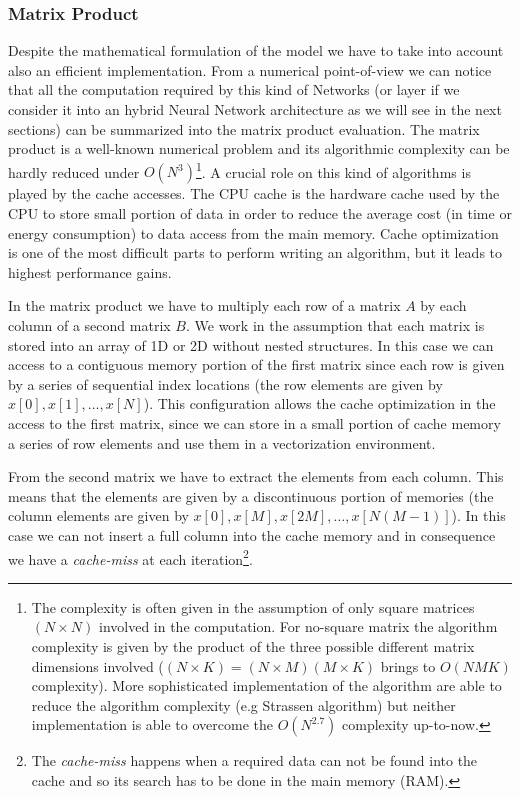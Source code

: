\documentclass{standalone}
\begin{document}
\subsubsection[Matrix Product]{Matrix Product}\label{NN:gemm}

Despite the mathematical formulation of the model we have to take into account also an efficient implementation.
From a numerical point-of-view we can notice that all the computation required by this kind of Networks (or layer if we consider it into an hybrid Neural Network architecture as we will see in the next sections) can be summarized into the matrix product evaluation.
The matrix product is a well-known numerical problem and its algorithmic complexity can be hardly reduced under $O(N^3)$\footnote{
  The complexity is often given in the assumption of only square matrices $(N\times N)$ involved in the computation.
  For no-square matrix the algorithm complexity is given by the product of the three possible different matrix dimensions involved ($(N\times K) = (N\times M)(M\times K)$ brings to $O(NMK)$ complexity).
  More sophisticated implementation of the algorithm are able to reduce the algorithm complexity (e.g Strassen algorithm) but neither implementation is able to overcome the $O(N^{2.7})$ complexity up-to-now.
}.
A crucial role on this kind of algorithms is played by the cache accesses.
The CPU cache is the hardware cache used by the CPU to store small portion of data in order to reduce the average cost (in time or energy consumption) to data access from the main memory.
Cache optimization is one of the most difficult parts to perform writing an algorithm, but it leads to highest performance gains.

In the matrix product we have to multiply each row of a matrix $A$ by each column of a second matrix $B$.
We work in the assumption that each matrix is stored into an array of 1D or 2D without nested structures.
In this case we can access to a contiguous memory portion of the first matrix since each row is given by a series of sequential index locations (the row elements are given by $x[0], x[1], \dots, x[N]$).
This configuration allows the cache optimization in the access to the first matrix, since we can store in a small portion of cache memory a series of row elements and use them in a vectorization environment.

From the second matrix we have to extract the elements from each column.
This means that the elements are given by a discontinuous portion of memories (the column elements are given by $x[0], x[M], x[2M], \dots, x[N(M-1)]$).
In this case we can not insert a full column into the cache memory and in consequence we have a \emph{cache-miss} at each iteration\footnote{
  The \emph{cache-miss} happens when a required data can not be found into the cache and so its search has to be done in the main memory (RAM).
}.
\end{document}
